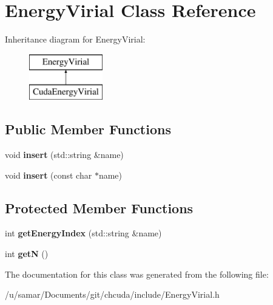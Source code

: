 \hypertarget{classEnergyVirial}{}\section{Energy\+Virial Class Reference}
\label{classEnergyVirial}
Inheritance diagram for Energy\+Virial\+:\begin{figure}[H]
\begin{center}
\leavevmode
\includegraphics[height=2.000000cm]{classEnergyVirial}
\end{center}
\end{figure}
\subsection*{Public Member Functions}
\begin{DoxyCompactItemize}
\item 
\hypertarget{classEnergyVirial_ab0a01de91fea550a18be0b18fa9c8606}{}\label{classEnergyVirial_ab0a01de91fea550a18be0b18fa9c8606} 
void {\bfseries insert} (std\+::string \&name)
\item 
\hypertarget{classEnergyVirial_a4872fe5229c9a422bf7e5491cf2cda95}{}\label{classEnergyVirial_a4872fe5229c9a422bf7e5491cf2cda95} 
void {\bfseries insert} (const char $\ast$name)
\end{DoxyCompactItemize}
\subsection*{Protected Member Functions}
\begin{DoxyCompactItemize}
\item 
\hypertarget{classEnergyVirial_acc8c3f4db9dadd50ab4a1f92a7aa2554}{}\label{classEnergyVirial_acc8c3f4db9dadd50ab4a1f92a7aa2554} 
int {\bfseries get\+Energy\+Index} (std\+::string \&name)
\item 
\hypertarget{classEnergyVirial_abf03f7667ab45b697356b34df5b723e9}{}\label{classEnergyVirial_abf03f7667ab45b697356b34df5b723e9} 
int {\bfseries getN} ()
\end{DoxyCompactItemize}


The documentation for this class was generated from the following file\+:\begin{DoxyCompactItemize}
\item 
/u/samar/\+Documents/git/chcuda/include/Energy\+Virial.\+h\end{DoxyCompactItemize}
